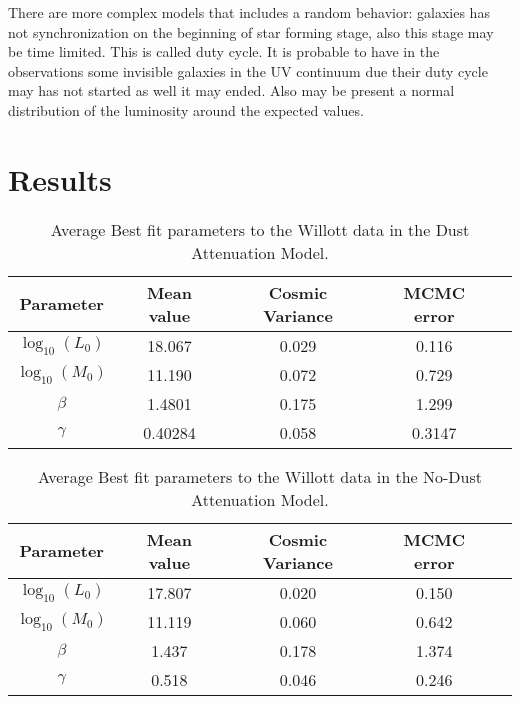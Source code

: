 \documentclass{emulateapj}
\begin{document}
There are more complex models\citep{lee09} that includes a random behavior:
galaxies has not synchronization on the beginning of star forming stage, also
this stage may be time limited. This is called duty cycle. It is probable to
have in the observations some invisible galaxies in the UV continuum due their
duty cycle may has not started as well it may ended. Also may be present a
normal distribution of the luminosity around the expected values.

\section{Results}
\label{sec:results}

\begin{table}
\begin{center}
\begin{tabular}{ccccc}\hline\hline
Parameter  & Mean value & Cosmic Variance & MCMC error\\\hline
$\log_{10}(L_0)$   & 18.067   & 0.029   & 0.116 \\
$\log_{10}(M_0)$  & 11.190   & 0.072   & 0.729 \\
$\beta$                  & 1.4801  & 0.175   & 1.299 \\
$\gamma$             & 0.40284 & 0.058  & 0.3147\\
\hline\hline
\end{tabular}
\caption{  Average Best fit parameters to the Willott data in the Dust Attenuation Model.} 
\label{table:Willott_best_fit_parameters}
\end{center}
\end{table}

\begin{table}
\begin{center}
\begin{tabular}{ccccc}\hline\hline
Parameter  & Mean value & Cosmic Variance & MCMC error\\\hline
$\log_{10}(L_0)$   & 17.807   & 0.020   & 0.150 \\
$\log_{10}(M_0)$  & 11.119    & 0.060   & 0.642 \\
$\beta$                  &  1.437    & 0.178   & 1.374 \\
$\gamma$             &   0.518   & 0.046  & 0.246\\
\hline\hline
\end{tabular}
\caption{  Average Best fit parameters to the Willott data in the No-Dust Attenuation Model.} 
\label{table:Willott_best_fit_parameters_no_dust}
\end{center}
\end{table}
\end{document}
